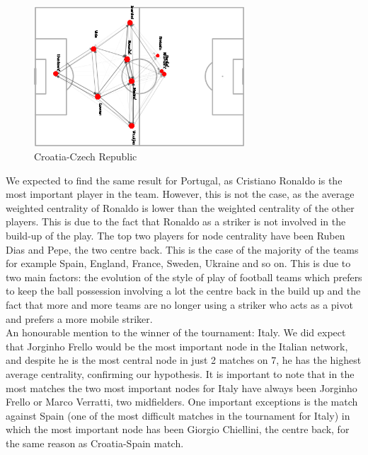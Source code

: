 \documentclass[12pt, a4paper]{article}
\begin{document}
\begin{figure}[H]
    \centering
    \includegraphics[width=0.7\textwidth]{../NoSubs/ImagesToRedo/Croatia_Network_Croatia_Czech Republic.png}
    \caption{Croatia-Czech Republic}
    \label{fig: spain_sweden}
\end{figure}


We expected to find the same result for Portugal, as Cristiano Ronaldo is the most important player in the team. However, this is not the case, as the average weighted centrality of Ronaldo is lower than the weighted centrality of the other players. This is due to the fact that Ronaldo as a striker is not involved in the build-up of the play. The top two players for node centrality have been Ruben Dias and Pepe, the two centre back. This is the case of the majority of the teams for example Spain, England, France, Sweden, Ukraine and so on. This is due to two main factors: the evolution of the style of play of football teams which prefers to keep the ball possession involving a lot the centre back in the build up and the fact that more and more teams are no longer using a striker who acts as a pivot and prefers a more mobile striker. \\
An honourable mention to the winner of the tournament: Italy. We did expect that Jorginho Frello would be the most important node in the Italian network, and despite he is the most central node in just 2 matches on 7, he has the highest average centrality, confirming our hypothesis. It is important to note that in the most matches the two most important nodes for Italy have always been Jorginho Frello or Marco Verratti, two midfielders. One important exceptions is the match against Spain (one of the most difficult matches in the tournament for Italy) in which the most important node has been Giorgio Chiellini, the centre back, for the same reason as Croatia-Spain match. \\
\end{document}
